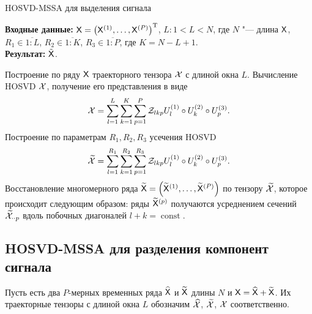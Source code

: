 \documentclass[specialist,
  substylefile=spbu.rtx,
subf,href,colorlinks=true, 12pt]{disser}
\theoremstyle{plain}
\theoremstyle{definition}
\theoremstyle{remark}
\newcommand{\Input}{\textbf{Входные данные: }}
\newcommand{\Output}{\textbf{Результат: }}
\begin{document}
\begin{algorithm}[!ht]
  \caption{HOSVD-MSSA для выделения сигнала}
  \label{alg:hosvd-mssa}
  \Input $\mathsf{X} = \left(\mathsf{X}^{(1)}, \ldots, \mathsf{X}^{(P)}\right)^{\mathrm{T}}$,
  $L: 1< L < N$, где $N$ "--- длина $\mathsf{X}$, $R_1 \in \overline{1:L}$,
  $R_2 \in \overline{1:K}$, $R_3 \in \overline{1:P}$, где $K = N-L+1$.\\
  \Output $\tilde{\mathsf{X}}$.
  \begin{algorithmic}[1]
    \State Построение по ряду $\mathsf{X}$ траекторного тензора $\mathcal{X}$ с длиной окна $L$.
    \State Вычисление HOSVD $\mathcal{X}$, получение его представления в виде
    \begin{equation}
      \mathcal{X} = \sum_{l=1}^{L} \sum_{k=1}^{K} \sum_{p=1}^{P} \mathcal{Z}_{lkp} U_l^{(1)}\circ U_k^{(2)} \circ U_p^{(3)}.
      \label{eq:hosvd-mssa}
    \end{equation}
    \State Построение по параметрам $R_1, R_2, R_3$ усечения HOSVD
    \[
      \widetilde{\mathcal{X}}=\sum_{l=1}^{R_1} \sum_{k=1}^{R_2} \sum_{p=1}^{R_3} \mathcal{Z}_{lkp} U_l^{(1)}\circ U_k^{(2)} \circ U_p^{(3)}.
    \]
    \State \label{step:hosvd-mssa-sep-restoration} Восстановление многомерного ряда $\widetilde{\mathsf{X}}=\left(\widetilde{\mathsf{X}}^{(1)}, \ldots, \widetilde{\mathsf{X}}^{(P)}\right)$ по тензору
    $\widetilde{\mathcal{X}}$, которое происходит следующим образом:
    ряды $\widetilde{\mathsf{X}}^{(p)}$ получаются усреднением сечений $\widetilde{\mathcal{X}}_{\cdot \cdot p}$ вдоль
    побочных диагоналей $l+k=\operatorname{const}$.
  \end{algorithmic}
\end{algorithm}

\subsection{HOSVD-MSSA для разделения компонент сигнала}\label{subsec:Tensor-MSSA-sep-method-description}
Пусть есть два $P$-мерных временных ряда $\widehat{\mathsf{X}}$ и $\widetilde{\mathsf{X}}$ длины $N$ и
$\mathsf{X} = \widehat{\mathsf{X}} + \widetilde{\mathsf{X}}$. Их траекторные тензоры с длиной окна $L$ обозначим
$\widehat{\mathcal{X}}$, $\widetilde{\mathcal{X}}$, $\mathcal{X}$ соответственно.
\end{document}
